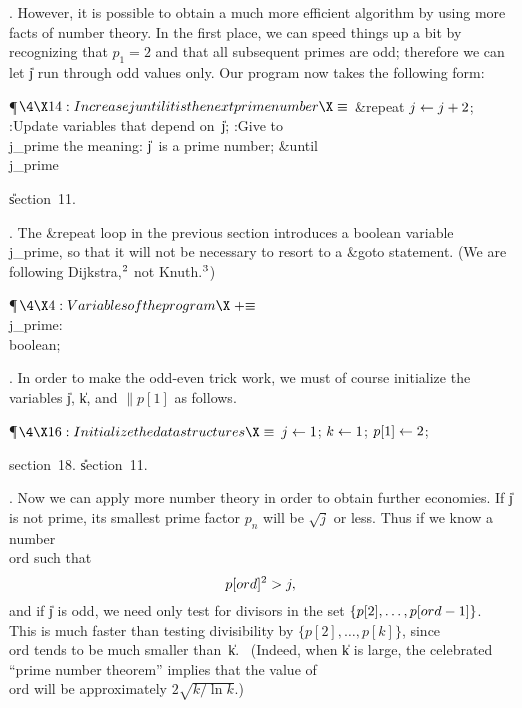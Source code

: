 \fi

. However, it is possible to obtain a much more efficient algorithm by
using more facts of number theory. In the first place, we can speed
things up a bit by recognizing that $p_1=2$ and that all subsequent
primes are odd; therefore we can let \|j run through odd values only.
Our program now takes the following form:

\Y\P$\4\X14:Increase \|j until it is the next prime number\X\S$\6
\1\&{repeat} $\hbox{$j$}\gets\hbox{$j$}+2$;\5
:Update variables that depend on~\|j\X;\6
:Give to \\{j\_prime} the meaning: \|j~is a prime number\X;\6
\4\&{until}\5
\\{j\_prime}\2\par
\U section~11.\fi

. The  \&{repeat}  loop in the previous section introduces a boolean
variable \\{j\_prime}, so that it will not be necessary to resort to
a \&{goto}  statement. (We are following Dijkstra,$^{2}$ not Knuth.$^{3}$)

\Y\P$\4\X4:Variables of the program\X\mathrel{+}\S$\6
\4\\{j\_prime}: \\{boolean};\par
\fi

. In order to make the odd-even trick work, we must of course initialize
the variables \|j, \|k, and $\|p[1]$ as follows.

\Y\P$\4\X16:Initialize the data structures\X\S$\6
$\hbox{$j$}\gets1$;\5
$\hbox{$k$}\gets1$;\5
$\hbox{$p$}[1]\gets2$;\par
\A section~18.
\U section~11.\fi

. Now we can apply more number theory in order to obtain further
economies. If \|j is not prime, its smallest prime factor $p_n$ will
be $\sqrt j$ or less. Thus if we know a number \\{ord} such that
$$p[\\{ord}]^2>j,$$ and if \|j is odd, we need only test for divisors
in the set $\{p[2], \ldots, p[\\{ord}-1]\}$. This is much faster than
testing divisibility by $\{p[2],\ldots,p[k]\}$, since \\{ord} tends
to be much smaller than~\|k. \ (Indeed, when \|k is large, the
celebrated ``prime number theorem'' implies that the value of \\{ord}
will be approximately $2\sqrt{k/\!\ln k}$.)


